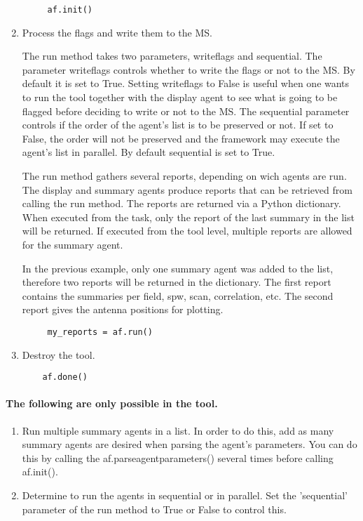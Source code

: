 \begin{enumerate}
\begin{verbatim}
     af.init()
\end{verbatim}

\item Process the flags and write them to the MS.

The run method takes two parameters, writeflags and sequential.
The parameter writeflags controls whether to write the flags or not to the MS.
By default it is set to True. Setting writeflags to False is useful when one
wants to run the tool together with the display agent to see what is going to be
flagged before deciding to write or not to the MS. The sequential parameter
controls if the order of the agent's list is to be preserved or not. If set to
False, the order will not be preserved and the framework may execute the agent's list in parallel.
By default sequential is set to True.

The run method gathers several reports, depending on wich agents are run. The display and summary agents
produce reports that can be retrieved from calling the run method. The reports are returned via a Python
dictionary. When executed from the task, only the report of the
last summary in the list will be returned. If executed from the tool level,
multiple reports are allowed for the summary agent.

In the previous example, only one summary agent was added to the list, therefore
two reports will be returned in the dictionary. The first report contains the
summaries per field, spw, scan, correlation, etc. The second report
gives the antenna positions for plotting.

\begin{verbatim}
     my_reports = af.run()
\end{verbatim}

\item Destroy the tool.

\begin{verbatim}
    af.done()
\end{verbatim}
 \end{enumerate}
 
\paragraph{The following are only possible in the tool.}
\begin{enumerate}

\item Run multiple summary agents in a list. In order to do this, add as many
summary agents are desired when parsing the agent's parameters. You can do this by
calling the af.parseagentparameters() several times before calling af.init().

\item Determine to run the agents in sequential or in parallel. Set the
'sequential' parameter of the run method to True or False to control this.

\end{enumerate}

